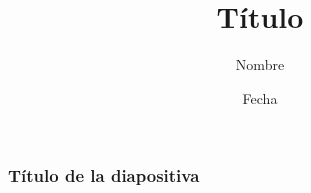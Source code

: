 \documentclass{beamer}
\title{Título}
\author{Nombre}
\institute{Universidad}
\date{Fecha}
\begin{document}
    \frame{\titlepage} %
    \begin{frame}
        \frametitle{Título de la diapositiva}
    \end{frame}
\end{document}
